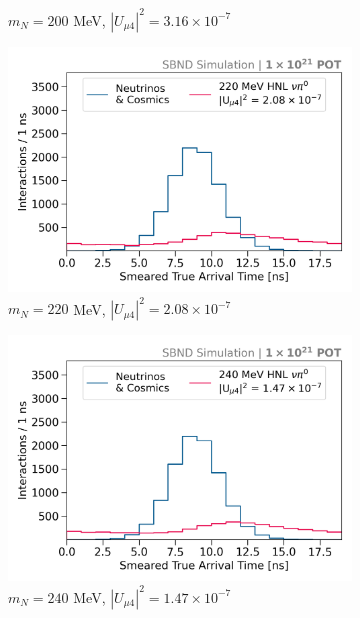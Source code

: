 \begin{figure}[htbp!]
\begin{subfigure}[b]{0.495\textwidth}
            \caption{$m_N = 200$ MeV, $|U_{\mu4}|^2 = 3.16 \times 10^{-7}$ }
        \end{subfigure}
        \begin{subfigure}[b]{0.495\textwidth}
            \includegraphics[width=\textwidth]{m220}
            \caption{$m_N = 220$ MeV, $|U_{\mu4}|^2 = 2.08 \times 10^{-7}$ }
        \end{subfigure}
        \begin{subfigure}[b]{0.495\textwidth}
            \includegraphics[width=\textwidth]{m240}
            \caption{$m_N = 240$ MeV, $|U_{\mu4}|^2 = 1.47 \times 10^{-7}$ }
        \end{subfigure}
	\centering
        \begin{subfigure}[b]{0.495\textwidth}

\end{subfigure}
\end{figure}
